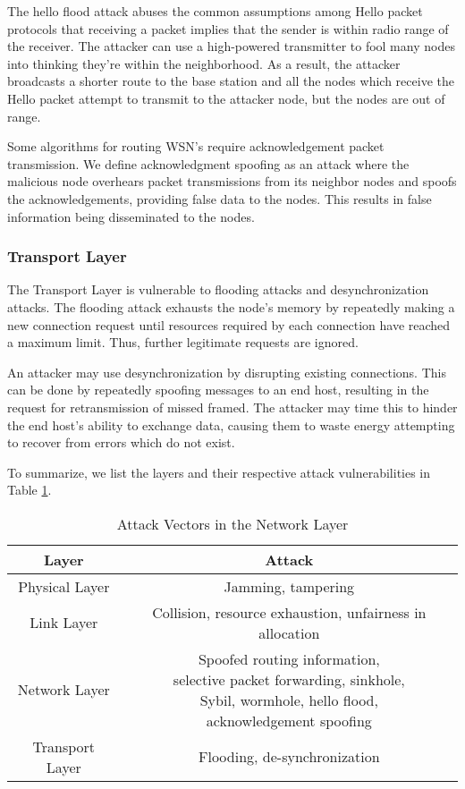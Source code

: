 \documentclass[12pt,a4paper,twoside]{report}
\begin{document}
The hello flood attack abuses the common assumptions among Hello packet protocols that receiving a packet implies that the sender is within radio range of the receiver. The attacker can use a high-powered transmitter to fool many nodes into thinking they're within the neighborhood. As a result, the attacker broadcasts a shorter route to the base station and all the nodes which receive the Hello packet attempt to transmit to the attacker node, but the nodes are out of range. \par
Some algorithms for routing WSN's require acknowledgement packet transmission. We define acknowledgment spoofing as an attack where the malicious node overhears packet transmissions from its neighbor nodes and spoofs the acknowledgements, providing false data to the nodes. This results in false information being disseminated to the nodes. \par
\subsubsection{Transport Layer}
The Transport Layer is vulnerable to flooding attacks and desynchronization attacks. The flooding attack exhausts the node's memory by repeatedly making a new connection request until resources required by each connection have reached a maximum limit. Thus, further legitimate requests are ignored.\par
An attacker may use desynchronization by disrupting existing connections. This can be done by repeatedly spoofing messages to an end host, resulting in the request for retransmission of missed framed. The attacker may time this to hinder the end host's ability to exchange data, causing them to waste energy attempting to recover from errors which do not exist. \par
To summarize, we list the layers and their respective attack vulnerabilities in Table \ref{tab:01}.  \par
  \begin{table}[h]
	\caption{Attack Vectors in the Network Layer}
	\label{tab:01}
  	\begin{center}
    \begin{tabular}{|c|c|} \hline
	        Layer & Attack \\ \hline\hline
	        Physical Layer & Jamming, tampering \\ \hline
	        Link Layer & Collision, resource exhaustion, unfairness in allocation \\ \hline
	        Network Layer & \shortstack{Spoofed routing information, \\selective packet forwarding, sinkhole,\\ Sybil, wormhole, hello flood, \\acknowledgement spoofing} \\ \hline
	        Transport Layer & Flooding, de-synchronization \\ \hline
	  \end{tabular}
	  \end{center}
  \end{table}
  \label{tab:01}
\end{document}

